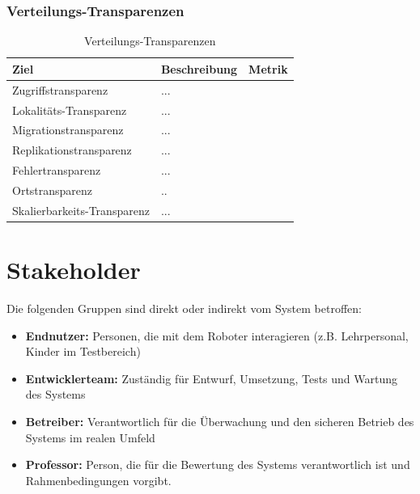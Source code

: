 \subsubsection{Verteilungs-Transparenzen}
    \begin{table}[h!]
            \centering
            \begin{tabular}{p{4cm}|p{5cm}|p{5cm}|}
                \hline
                \textbf{Ziel} & \textbf{Beschreibung} & \textbf{Metrik} \\
                \hline
                Zugriffstransparenz   & ...&\\
                \hline
                Lokalitäts-Transparenz  & ...&\\
                \hline
                Migrationstransparenz & ...&\\
                \hline
                Replikationstransparenz &...&\\
                \hline
                Fehlertransparenz &... &\\
                \hline
                Ortstransparenz & .. &\\
                \hline
                Skalierbarkeits-Transparenz & ... & \\
                \hline
            \end{tabular}
            \caption{Verteilungs-Transparenzen}
            \label{tab:transparenzen}
        \end{table}
        



\clearpage
\section{Stakeholder}
Die folgenden Gruppen sind direkt oder indirekt vom System betroffen:

\begin{itemize}
    \item \textbf{Endnutzer:} Personen, die mit dem Roboter interagieren (z.B. Lehrpersonal, Kinder im Testbereich)
    \item \textbf{Entwicklerteam:} Zuständig für Entwurf, Umsetzung, Tests und Wartung des Systems
    \item \textbf{Betreiber:} Verantwortlich für die Überwachung und den sicheren Betrieb des Systems im realen Umfeld
    \item \textbf{Professor:} Person, die für die Bewertung des Systems verantwortlich ist und Rahmenbedingungen vorgibt.

\end{itemize}



